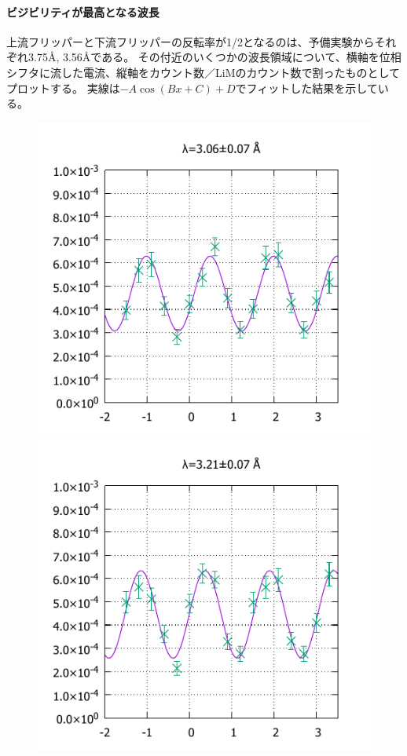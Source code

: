 \paragraph{ビジビリティが最高となる波長}
上流フリッパーと下流フリッパーの反転率が1/2となるのは、予備実験からそれぞれ3.75Å, 3.56Åである。
その付近のいくつかの波長領域について、横軸を位相シフタに流した電流、縦軸をカウント数／LiMのカウント数で割ったものとしてプロットする。
実線は$-A\cos(Bx+C)+D$でフィットした結果を示している。
\begin{figure}[H]
\centering
\begin{minipage}{0.33\hsize}
\includegraphics[width=\imgwidth]{phase_shifter/wl/wlf1.pdf}
\end{minipage}
\begin{minipage}{0.33\hsize}
\includegraphics[width=\imgwidth]{phase_shifter/wl/wlf2.pdf}

\end{minipage}
\end{figure}
